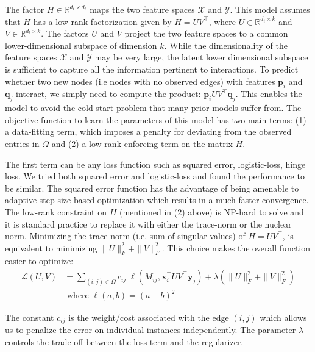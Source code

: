 \documentclass{bioinfo}
\begin{document}
The factor $H \in \mathbb{R}^{d_t \times d_t}$ maps the two feature spaces $\mathcal{X}$ and $\mathcal{Y}$. This model assumes that $H$ has a low-rank factorization given by $H = U V^\intercal$, where $U \in \mathbb{R}^{d_t \times k}$ and $V \in \mathbb{R}^{d_t \times k}$. The factors $U$ and $V$ project the two feature spaces to a common lower-dimensional subspace of dimension $k$. While the dimensionality of the feature spaces $\mathcal{X}$ and $\mathcal{Y}$ may be very large, the latent lower dimensional subspace is sufficient to capture all the information pertinent to interactions. To predict whether two new nodes (i.e nodes with no observed edges) with features $\mathbf{p}_i$ and $\mathbf{q}_j$ interact, we simply need to compute the product: $\mathbf{p}_i U V^\intercal \mathbf{q}_j$. This enables the model to avoid the cold start problem that many prior models suffer from. The objective function to learn the parameters of this model has two main terms: (1) a data-fitting term, which imposes a penalty for deviating from the observed entries in $\Omega$ and (2) a low-rank enforcing term on the matrix $H$. 

The first term can be any loss function such as squared error, logistic-loss, hinge loss. We tried both squared error and logistic-loss and found the performance to be similar. The squared error function has the advantage of being amenable to adaptive step-size based optimization which results in a much faster convergence. The low-rank constraint on $H$ (mentioned in (2) above) is NP-hard to solve and it is standard practice to replace it with either the trace-norm or the nuclear norm. Minimizing the trace norm (i.e. sum of singular values) of $H = UV^\intercal$, is equivalent to minimizing $\|U\|^2_F + \|V\|^2_F$. This choice makes the overall function easier to optimize:
\begin{equation}
\label{objective}
\begin{array}{ll}
\mathcal{L}(U,V) & =\displaystyle{\sum_{(i,j) \in \Omega}} c_{ij} \; \ell(M_{ij}, \mathbf{x}_i^\intercal U V^\intercal \mathbf{y}_j) + \lambda ( \|U\|^2_F + \|V\|^2_F ) \\
& \textrm{ where } \ell(a, b) = (a - b)^2
\end{array}
\end{equation}

The constant $c_{ij}$ is the weight/cost associated with the edge $(i,j)$ which allows us to penalize the error on individual instances independently. The parameter $\lambda$ controls the trade-off between the loss term and the regularizer. 
\end{document}
